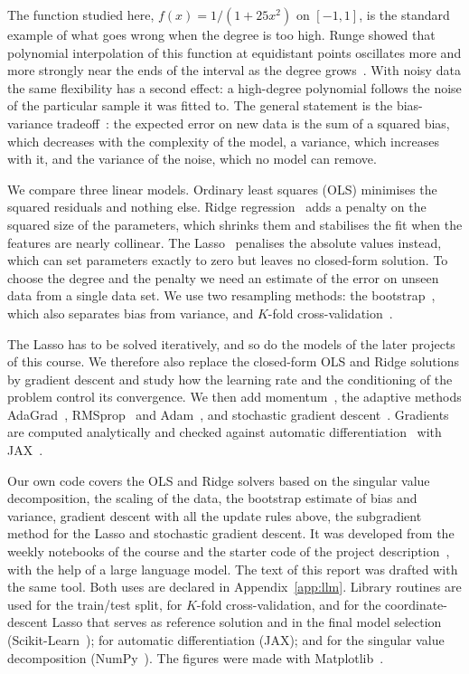 \documentclass[aps,reprint,amsmath,amssymb,nofootinbib,floatfix]{revtex4-2}
\begin{document}
The function studied here, $f(x)=1/(1+25x^2)$ on $[-1,1]$, is the standard example of what goes
wrong when the degree is too high. Runge showed that polynomial interpolation of this function at
equidistant points oscillates more and more strongly near the ends of the interval as the degree
grows~\cite{runge1901}. With noisy data the same flexibility has a second effect: a high-degree
polynomial follows the noise of the particular sample it was fitted to. The general statement
is the bias-variance tradeoff~\cite{hastie2009,hjorthjensen2026}: the expected error on new data
is the sum of a squared bias, which decreases with the complexity of the model, a variance, which
increases with it, and the variance of the noise, which no model can remove.

We compare three linear models. Ordinary least squares (OLS) minimises the squared residuals and
nothing else. Ridge regression~\cite{hoerl1970} adds a penalty on the squared size of the
parameters, which shrinks them and stabilises the fit when the features are nearly collinear. The
Lasso~\cite{tibshirani1996} penalises the absolute values instead, which can set parameters exactly
to zero but leaves no closed-form solution. To choose the degree and the penalty we need an
estimate of the error on unseen data from a single data set. We use two resampling methods: the
bootstrap~\cite{efron1979}, which also separates bias from variance, and $K$-fold
cross-validation~\cite{hastie2009,hjorthjensen2026}.

The Lasso has to be solved iteratively, and so do the models of the later projects of this course.
We therefore also replace the closed-form OLS and Ridge solutions by gradient descent and study
how the learning rate and the conditioning of the problem control its convergence. We then add
momentum~\cite{polyak1964}, the adaptive methods AdaGrad~\cite{duchi2011},
RMSprop~\cite{tieleman2012} and Adam~\cite{kingma2015}, and stochastic gradient
descent~\cite{robbins1951}. Gradients are computed analytically and checked against automatic
differentiation~\cite{baydin2018} with JAX~\cite{jax2018}.

Our own code covers the OLS and Ridge solvers based on the singular value decomposition, the
scaling of the data, the bootstrap estimate of bias and variance, gradient descent with all the
update rules above, the subgradient method for the Lasso and stochastic gradient descent. It was
developed from the weekly notebooks of the course and the starter code of the project
description~\cite{weekly2026,project1}, with the help of a large language model. The text of this
report was drafted with the same tool. Both uses are declared in Appendix~\ref{app:llm}. Library routines are used for the train/test split, for $K$-fold
cross-validation, and for the coordinate-descent Lasso that serves as reference solution and in the
final model selection (Scikit-Learn~\cite{pedregosa2011}); for automatic differentiation (JAX); and
for the singular value decomposition (NumPy~\cite{harris2020}). The figures were made with
Matplotlib~\cite{hunter2007}.
\end{document}
